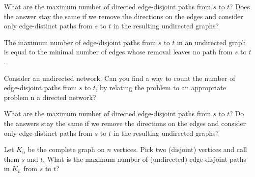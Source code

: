 \documentclass[10pt, a4paper]{article}
\begin{document}
\begin{example}
\begin{solution}
\begin{figure}[H]
        \end{figure}
    \end{solution}
\end{example}

\begin{example}
    What are the maximum number of directed edge-disjoint paths from $s$ to $t$?
    Does the answer stay the same if we remove the directions on the edges and consider only edge-distinct paths from $s$ to $t$ in the resulting undirected graphs?
\end{example}

\begin{theorem}
    The maximum number of edge-disjoint paths from $s$ to $t$ in an undirected graph is equal to the minimal number of edges whose removal leaves no path from $s$ to $t$.
\end{theorem}

\begin{example}
    Consider an undirected network.
    Can you find a way to count the number of edge-disjoint paths from $s$ to $t$,
    by relating the problem to an appropriate problem n a directed network?
\end{example}

\begin{example}
    What are the maximum number of directed edge-disjoint paths from $s$ to $t$?
    Do the answers stay the same if we remove the directions on the edges and consider only edge-distinct paths from $s$ to $t$ in the resulting undirected graphs?
\end{example}

\begin{example}
    Let $K_n$ be the complete graph on $n$ vertices.
    Pick two
    (disjoint)
    vertices and call them $s$ and $t$.
    What is the maximum number of
    (undirected)
    edge-disjoint paths in $K_n$ from $s$ to $t$?
\end{example}
\end{document}
